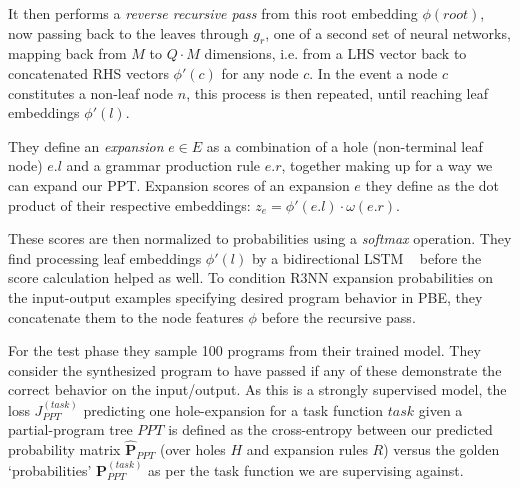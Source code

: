 \documentclass{article} %
\begin{document}
It then performs a \emph{reverse recursive pass} from this root embedding $\phi(root)$,
now passing back to the leaves through $g_r$,
one of a second set of neural networks,
mapping back from $M$ to $Q \cdot M$ dimensions,
i.e. from a LHS vector back to concatenated RHS vectors $\phi'(c)$ for any node $c$.
%
In the event a node $c$ constitutes a non-leaf node $n$,
this process is then repeated, until reaching leaf embeddings $\phi'(l)$.

They define an \emph{expansion} $e \in E$ as a combination of a hole (non-terminal leaf node) $e.l$ and a grammar production rule $e.r$, together making up for a way we can expand our PPT.
Expansion scores of an expansion $e$ they define as the dot product of their respective embeddings:
$z_e = \phi'(e.l) \cdot \omega(e.r)$.

These scores are then normalized to probabilities using a \emph{softmax} operation.
They find processing leaf embeddings $\phi'(l)$ by a bidirectional LSTM%
~\citep{huang2015bidirectional} before the score calculation helped as well.
To condition R3NN expansion probabilities on the input-output examples specifying desired program behavior in PBE,
they concatenate them to the node features $\phi$ before the recursive pass.

For the test phase they sample 100 programs from their trained model.
They consider the synthesized program to have passed if any of these demonstrate the correct behavior on the input/output.
%
As this is a strongly supervised model,
the loss $J^{(task)}_{PPT}$ predicting one hole-expansion for a task function $task$ given a
partial-program tree $PPT$ is defined as the cross-entropy between our predicted probability matrix
$\mathbf{\hat{P}}_{PPT}$ (over holes $H$ and expansion rules $R$)
versus the golden `probabilities' $\mathbf{P}^{(task)}_{PPT}$ as per the task function we are supervising against.

\end{document}
